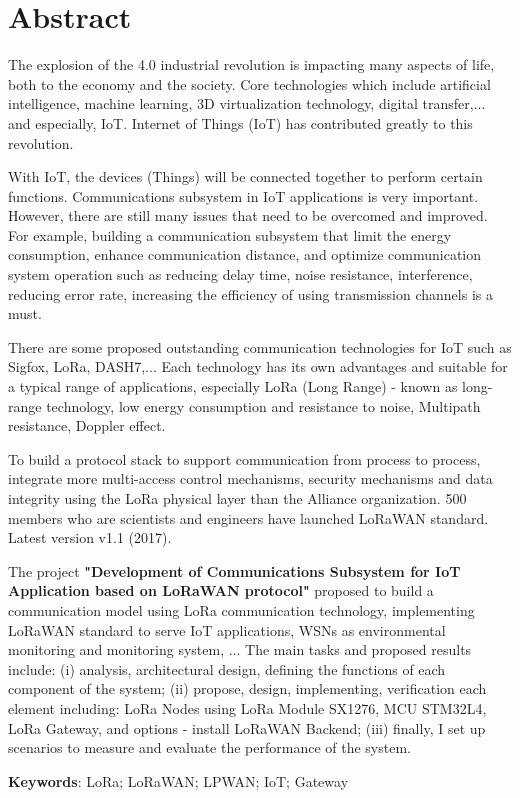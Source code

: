 \thispagestyle{plain}
\chapter*{Abstract}
The explosion of the 4.0 industrial revolution is impacting many aspects of life, both to the economy and the society. Core technologies which include artificial intelligence, machine learning, 3D virtualization technology, digital transfer,... and especially, IoT. Internet of Things (IoT) has contributed greatly to this revolution. \par
With IoT, the devices (Things) will be connected together to perform certain functions. Communications subsystem in IoT applications is very important. However, there are still many issues that need to be overcomed and improved. For example, building a communication subsystem that limit the energy consumption, enhance communication distance, and optimize communication system operation such as reducing delay time, noise resistance, interference, reducing error rate, increasing the efficiency of using transmission channels is a must. \par 
There are some proposed outstanding communication technologies for IoT such as Sigfox, LoRa, DASH7,... Each technology has its own advantages and suitable for a typical range of applications, especially LoRa (Long Range) - known as long-range technology, low energy consumption and resistance to noise, Multipath resistance, Doppler effect. \par
To build a protocol stack to support communication from process to process, integrate more multi-access control mechanisms, security mechanisms and data integrity using the LoRa physical layer than the Alliance organization. 500 members who are scientists and engineers have launched LoRaWAN standard. Latest version v1.1 (2017). \par 
The project \textbf{"Development of Communications Subsystem for IoT Application based on LoRaWAN protocol"} proposed to build a communication model using LoRa communication technology, implementing LoRaWAN standard to serve IoT applications, WSNs as environmental monitoring and monitoring system, ... The main tasks and proposed results include: (i) analysis, architectural design, defining the functions of each component of the system; (ii) propose, design, implementing, verification each element including: LoRa Nodes using LoRa Module SX1276, MCU STM32L4, LoRa Gateway, and options - install LoRaWAN Backend; (iii) finally, I set up scenarios to measure and evaluate the performance of the system. 

\null\vfill
\begin{flushleft}
\textbf{Keywords}: LoRa; LoRaWAN; LPWAN; IoT; Gateway
\end{flushleft}
 


